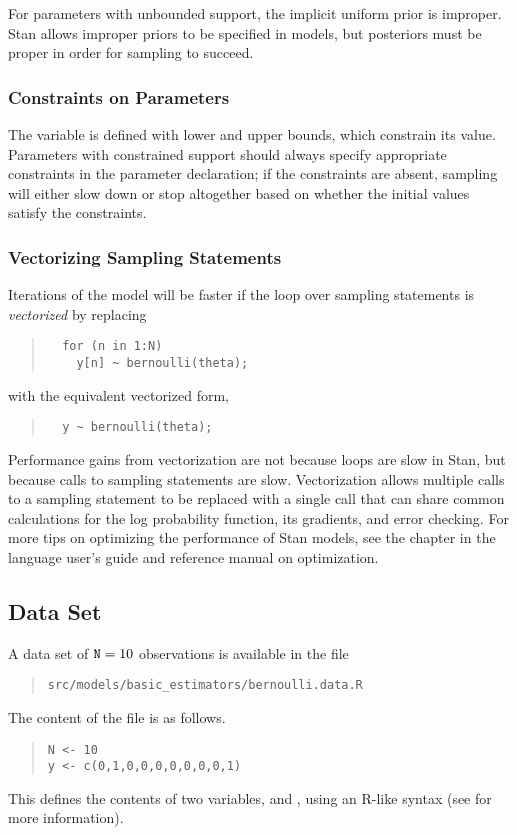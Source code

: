 For parameters with unbounded support, the implicit uniform prior is
improper.  Stan allows improper priors to be specified in models, but
posteriors must be proper in order for sampling to succeed.


\subsubsection{Constraints on Parameters}

The variable  is defined with lower and upper bounds,
which constrain its value.  Parameters with constrained support should
always specify appropriate constraints in the parameter declaration;
if the constraints are absent, sampling will either slow down or stop
altogether based on whether the initial values satisfy the constraints.

\subsubsection{Vectorizing Sampling Statements}

Iterations of the model will be faster if the loop over sampling
statements is \textit{vectorized} by replacing
%
\begin{quote}
\begin{Verbatim}
  for (n in 1:N) 
    y[n] ~ bernoulli(theta);
\end{Verbatim}
\end{quote}
%
with the equivalent vectorized form,
%
\begin{quote}
\begin{Verbatim}
  y ~ bernoulli(theta);
\end{Verbatim}
\end{quote}
%
Performance gains from vectorization are not because loops are slow in
Stan, but because calls to sampling statements are slow.
Vectorization allows multiple calls to a sampling statement to be
replaced with a single call that can share common calculations for the
log probability function, its gradients, and error checking.  For more
tips on optimizing the performance of Stan models, see the chapter in
the language user's guide and reference manual on optimization.


\subsection{Data Set}

A data set of $\mbox{{\tt N}}=10$ observations is available in the file
%
\begin{quote}
\nolinkurl{src/models/basic_estimators/bernoulli.data.R}
\end{quote}
%
The content of the file is as follows.
%
\begin{quote}
\begin{Verbatim}
N <- 10
y <- c(0,1,0,0,0,0,0,0,0,1)
\end{Verbatim}
\end{quote}
%
This defines the contents of two variables,  and ,
using an R-like syntax (see  for more information).



